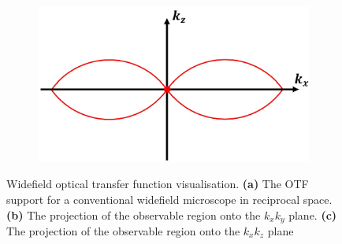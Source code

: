 \begin{figure}[h]
\begin{subfigure}[t]{0.25\textwidth}
		\caption{}
		\label{fig:3D_SIM_OTF_no_angle_2D_plot_xy}
	\end{subfigure}
	\begin{subfigure}[t]{0.435\textwidth}
		\centering
		\includegraphics[width=\linewidth]{images/3D_SIM_OTF_no_angle_2D_plot_xz.jpg}
		\caption{}
		\label{fig:3D_SIM_OTF_no_angle_2D_plot_xz}
	\end{subfigure}
	\caption[Widefield optical transfer function visualisation]{Widefield 
		optical transfer function visualisation. \textbf{(a)} The OTF support
		for a conventional widefield microscope in reciprocal space. 
		\textbf{(b)} The projection of the observable region onto the 
		$k_{x}k_{y}$ plane. \textbf{(c)} The projection of the observable 
		region onto the $k_{x}k_{z}$ plane}
	\label{fig:widefield_OTF_visualisation}
\end{figure}

